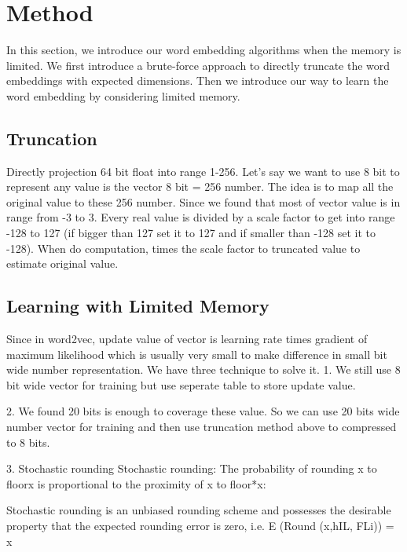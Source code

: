 \section{Method}
\label{sec:approach}
In this section, we introduce our word embedding algorithms when the memory is limited.
We first introduce a brute-force approach to directly truncate the word embeddings with expected dimensions.
Then we introduce our way to learn the word embedding by considering limited memory.

\subsection{Truncation}
Directly projection 64 bit float into range 1-256. Let’s say we want to use 8 bit to represent any value is the vector
8 bit = 256 number. The idea is to map all the original value to these 256 number. Since we found that most of vector value is in range from -3 to 3. Every real value is divided by a scale factor to get into range -128 to 127 (if bigger than 127 set it to 127 and if smaller than -128 set it to -128). When do computation, times the scale factor to truncated value to estimate original value.



\subsection{Learning with Limited Memory}
 Since in word2vec, update value of vector is learning rate times gradient of  maximum likelihood which is usually very small to make difference in  small bit wide number representation. We have three technique to solve it.
1. We still use 8 bit wide vector for training but use seperate table to store update value.

2. We found 20 bits is enough to coverage these value. So we can use 20 bits wide number vector for training and then use truncation method above to compressed to 8 bits.

3. Stochastic rounding
Stochastic rounding: The probability of rounding x
to floor{x} is proportional to the proximity of x to floor*{x}:

Stochastic rounding is an unbiased rounding
scheme and possesses the desirable property
that the expected rounding error is zero, i.e.
E (Round (x,hIL, FLi)) = x
